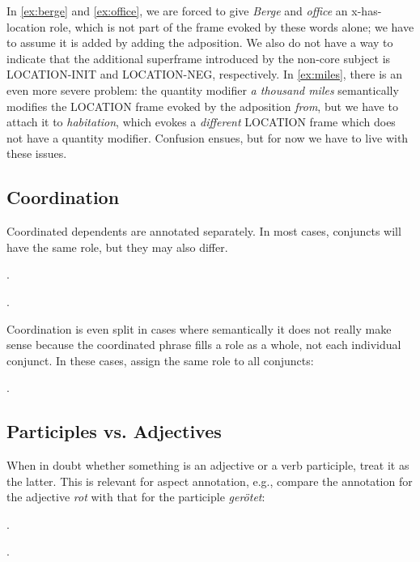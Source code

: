 \documentclass[a4paper]{article}
\newcommand{\fr}[1]{\textsf{#1}}
\newcommand{\rl}[1]{\textsf{#1}}
\begin{document}
In \ref{ex:berge} and \ref{ex:office}, we are forced to give \emph{Berge} and
\emph{office} an \rl{x-has-location} role, which is not part of the frame
evoked by these words alone; we have to assume it is added by adding the
adposition. We also do not have a way to indicate that the additional
superframe introduced by the non-core subject is \fr{LOCATION-INIT} and
\fr{LOCATION-NEG}, respectively. In \ref{ex:miles}, there is an even more
severe problem: the quantity modifier \emph{a thousand miles} semantically
modifies the \fr{LOCATION} frame evoked by the adposition \emph{from}, but we
have to attach it to \emph{habitation}, which evokes a \emph{different}
\fr{LOCATION} frame which does not have a quantity modifier. Confusion ensues,
but for now we have to live with these issues.


\newpage\subsection{Coordination}

Coordinated dependents are annotated separately. In most cases, conjuncts will have the same role, but they may also differ.

\ex.

\ex.

Coordination is even split in cases where semantically it does not really make
sense because the coordinated phrase fills a role as a whole, not each
individual conjunct. In these cases, assign the same role to all conjuncts:

\ex.


\newpage\subsection{Participles vs. Adjectives}

When in doubt whether something is an adjective or a verb participle, treat it
as the latter. This is relevant for aspect annotation, e.g., compare the
annotation for the adjective \emph{rot} with that for the participle
\emph{gerötet}:

\ex.

\ex.
\end{document}
